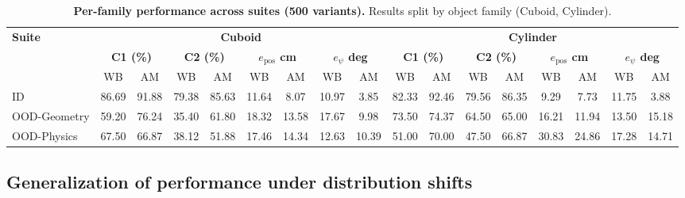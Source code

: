 \begin{table}[t]
\centering
\caption{\textbf{Per-family performance across suites (500 variants).} Results split by object family (Cuboid, Cylinder).}
\label{tab:per_family_main_results}
\footnotesize
\setlength{\tabcolsep}{2.6pt}
\renewcommand{\arraystretch}{1.08}
\begin{tabular}{lcccccccccccccccc}
\toprule
\multirow{3}{*}{\textbf{Suite}} &
\multicolumn{8}{c}{\textbf{Cuboid}} &
\multicolumn{8}{c}{\textbf{Cylinder}} \\
\cmidrule(lr){2-9}\cmidrule(lr){10-17}
& \multicolumn{2}{c}{\textbf{C1 (\%)}} & \multicolumn{2}{c}{\textbf{C2 (\%)}} &
  \multicolumn{2}{c}{\textbf{$e_{\text{pos}}$ cm}} &
  \multicolumn{2}{c}{\textbf{$e_{\psi}$ deg}} &
\multicolumn{2}{c}{\textbf{C1 (\%)}} & \multicolumn{2}{c}{\textbf{C2 (\%)}} &
  \multicolumn{2}{c}{\textbf{$e_{\text{pos}}$ cm}} &
  \multicolumn{2}{c}{\textbf{$e_{\psi}$ deg}} \\
\cmidrule(lr){2-3}\cmidrule(lr){4-5}\cmidrule(lr){6-7}\cmidrule(lr){8-9}
\cmidrule(lr){10-11}\cmidrule(lr){12-13}\cmidrule(lr){14-15}\cmidrule(lr){16-17}
& WB & AM & WB & AM & WB & AM & WB & AM & WB & AM & WB & AM & WB & AM & WB & AM \\
\midrule
ID
& 86.69 & 91.88 & 79.38 & 85.63 & 11.64 & 8.07  & 10.97 & 3.85
& 82.33 & 92.46 & 79.56 & 86.35 &  9.29 & 7.73  & 11.75 & 3.88 \\
OOD-Geometry
& 59.20 & 76.24 & 35.40 & 61.80 & 18.32 & 13.58 & 17.67 & 9.98
& 73.50 & 74.37 & 64.50 & 65.00 & 16.21 & 11.94 & 13.50 & 15.18 \\
OOD-Physics
& 67.50 & 66.87 & 38.12 & 51.88 & 17.46 & 14.34 & 12.63 & 10.39
& 51.00 & 70.00 & 47.50 & 66.87 & 30.83 & 24.86 & 17.28 & 14.71 \\
\bottomrule
\end{tabular}
\vspace{-0.9em}
\end{table}




\subsection{Generalization of performance under distribution shifts}
\label{subsec:results_gen}

